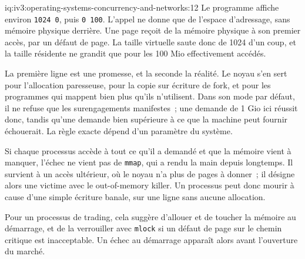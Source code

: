 \begin{solution}{iq:iv3:operating-systems-concurrency-and-networks:12}
Le programme affiche environ \texttt{1024 0}, puis \texttt{0 100}. L'appel ne donne que de l'espace d'adressage, sans mémoire physique derrière. Une page reçoit de la mémoire physique à son premier accès, par un défaut de page. La taille virtuelle saute donc de 1024 d'un coup, et la taille résidente ne grandit que pour les 100 Mio effectivement accédés.

La première ligne est une promesse, et la seconde la réalité. Le noyau s'en sert pour l'allocation paresseuse, pour la copie sur écriture de fork, et pour les programmes qui mappent bien plus qu'ils n'utilisent. Dans son mode par défaut, il ne refuse que les surengagements manifestes~; une demande de 1 Gio ici réussit donc, tandis qu'une demande bien supérieure à ce que la machine peut fournir échouerait. La règle exacte dépend d'un paramètre du système.

Si chaque processus accède à tout ce qu'il a demandé et que la mémoire vient à manquer, l'échec ne vient pas de \texttt{mmap}, qui a rendu la main depuis longtemps. Il survient à un accès ultérieur, où le noyau n'a plus de pages à donner~; il désigne alors une victime avec le out-of-memory killer. Un processus peut donc mourir à cause d'une simple écriture banale, sur une ligne sans aucune allocation.

Pour un processus de trading, cela suggère d'allouer et de toucher la mémoire au démarrage, et de la verrouiller avec \texttt{mlock} si un défaut de page sur le chemin critique est inacceptable. Un échec au démarrage apparaît alors avant l'ouverture du marché.

\end{solution}


